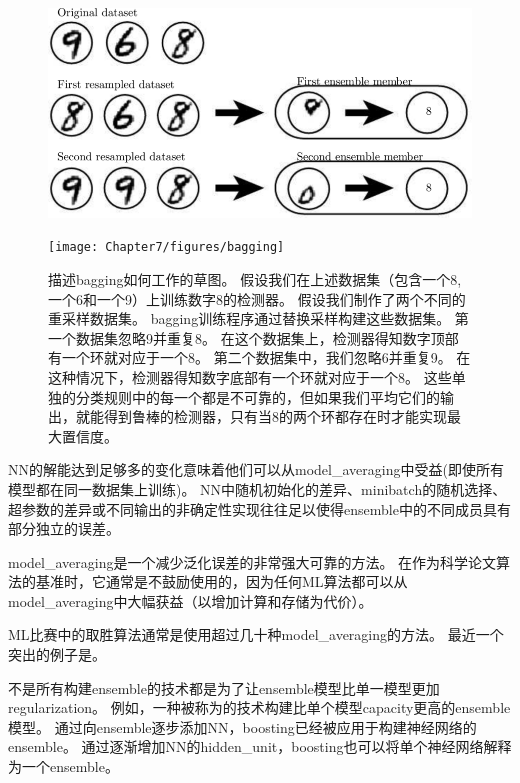 \begin{figure}[!htb]
\ifOpenSource
\centerline{\includegraphics[scale=0.5]{images/58.png}}
\else
\centerline{\texttt{[image: Chapter7/figures/bagging]}}
\fi
\caption{描述\gls{bagging}如何工作的草图。
假设我们在上述数据集（包含一个8,一个6和一个9）上训练数字8的检测器。
假设我们制作了两个不同的重采样数据集。
\gls{bagging}训练程序通过替换采样构建这些数据集。
第一个数据集忽略9并重复8。
在这个数据集上，检测器得知数字顶部有一个环就对应于一个8。
第二个数据集中，我们忽略6并重复9。
在这种情况下，检测器得知数字底部有一个环就对应于一个8。
这些单独的分类规则中的每一个都是不可靠的，但如果我们平均它们的输出，就能得到鲁棒的检测器，只有当8的两个环都存在时才能实现最大置信度。
}
\label{fig:chap7_bagging}
\end{figure}

\gls{NN}的解能达到足够多的变化意味着他们可以从\gls{model_averaging}中受益(即使所有模型都在同一数据集上训练)。
\gls{NN}中随机初始化的差异、\gls{minibatch}的随机选择、超参数的差异或不同输出的非确定性实现往往足以使得\gls{ensemble}中的不同成员具有部分独立的误差。


\gls{model_averaging}是一个减少泛化误差的非常强大可靠的方法。
在作为科学论文算法的基准时，它通常是不鼓励使用的，因为任何\gls{ML}算法都可以从\gls{model_averaging}中大幅获益（以增加计算和存储为代价）。

\gls{ML}比赛中的取胜算法通常是使用超过几十种\gls{model_averaging}的方法。
最近一个突出的例子是\citep{Koren-2009}。

不是所有构建\gls{ensemble}的技术都是为了让\gls{ensemble}模型比单一模型更加\gls{regularization}。
例如，一种被称为的技术\citep{Freund-Schapire-1996b,Freund-Schapire-1996a}构建比单个模型\gls{capacity}更高的\gls{ensemble}模型。
通过向\gls{ensemble}逐步添加\gls{NN}，\gls{boosting}已经被应用于构建神经网络的\gls{ensemble}\citep{Schwenk-Bengio-1998}。
通过逐渐增加\gls{NN}的\gls{hidden_unit}，\gls{boosting}也可以将单个神经网络解释为一个\gls{ensemble}\citep{Bengio-et-al-2006a}。

